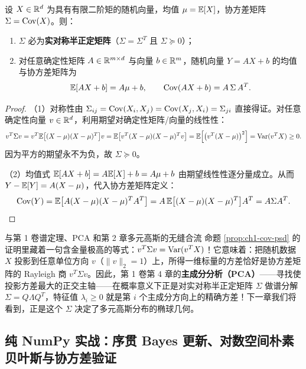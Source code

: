 \begin{thmBox}
\begin{proposition}[协方差矩阵的对称半正定性与线性变换律]
\label{prop:ch1-cov-psd}
设 $X \in \mathbb{R}^d$ 为具有有限二阶矩的随机向量，均值 $\mu = \mathbb{E}[X]$，协方差矩阵 $\Sigma = \operatorname{Cov}(X)$。则：
\begin{enumerate}
  \item $\Sigma$ 必为\textbf{实对称半正定矩阵}（$\Sigma = \Sigma^T$ 且 $\Sigma \succeq 0$）；
  \item 对任意确定性矩阵 $A \in \mathbb{R}^{m\times d}$ 与向量 $b \in \mathbb{R}^m$，随机向量 $Y = AX + b$ 的均值与协方差矩阵为
  \begin{equation}
    \mathbb{E}[AX + b] = A\mu + b, \qquad \operatorname{Cov}(AX + b) = A\,\Sigma\,A^T. \label{eq:ch1-cov-affine}
  \end{equation}
\end{enumerate}
\end{proposition}
\end{thmBox}

\begin{proof}
（1）对称性由 $\Sigma_{ij} = \operatorname{Cov}(X_i, X_j) = \operatorname{Cov}(X_j, X_i) = \Sigma_{ji}$ 直接得证。对任意确定性向量 $v \in \mathbb{R}^d$，利用期望对确定性矩阵/向量的线性性：
\[
  v^T \Sigma v
  = v^T \mathbb{E}\bigl[(X - \mu)(X - \mu)^T\bigr] v
  = \mathbb{E}\bigl[v^T(X - \mu)(X - \mu)^T v\bigr]
  = \mathbb{E}\Bigl[\bigl(v^T(X - \mu)\bigr)^2\Bigr]
  = \operatorname{Var}(v^T X) \ge 0.
\]
因为平方的期望永不为负，故 $\Sigma \succeq 0$。

（2）均值式 $\mathbb{E}[AX + b] = A\mathbb{E}[X] + b = A\mu + b$ 由期望线性性逐分量成立。从而 $Y - \mathbb{E}[Y] = A(X - \mu)$，代入协方差矩阵定义：
\[
  \operatorname{Cov}(Y) = \mathbb{E}\bigl[A(X-\mu)(X-\mu)^T A^T\bigr] = A\,\mathbb{E}\bigl[(X-\mu)(X-\mu)^T\bigr] A^T = A\Sigma A^T. \qedhere
\]
\end{proof}

\begin{insightBox}{与第 1 卷谱定理、PCA 和第 2 章多元高斯的无缝合流}
命题 \ref{prop:ch1-cov-psd} 的证明里藏着一句含金量极高的等式：$v^T \Sigma v = \operatorname{Var}(v^T X)$！它意味着：把随机数据 $X$ 投影到任意单位方向 $v$（$\|v\|_2 = 1$）上，所得一维标量的方差恰好是协方差矩阵的 Rayleigh 商 $v^T \Sigma v$。因此，第 1 卷第 4 章的\textbf{主成分分析（PCA）}——寻找使投影方差最大的正交主轴——在概率意义下正是对实对称半正定矩阵 $\Sigma$ 做谱分解 $\Sigma = Q\Lambda Q^T$，特征值 $\lambda_i \ge 0$ 就是第 $i$ 个主成分方向上的精确方差！下一章我们将看到，正是这个 $\Sigma$ 决定了多元高斯分布的椭球几何。
\end{insightBox}

\subsection{纯 NumPy 实战：序贯 Bayes 更新、对数空间朴素贝叶斯与协方差验证}

